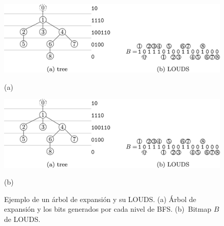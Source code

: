 \begin{figure}%
    	\centering
    	\begin{minipage}{0.45\textwidth}
    		\centering
    		\includegraphics[scale=1.6, clip,  trim=10 16 140 0]{img/arte/LOUDS.jpg}
    		
    		(a)
    	\end{minipage}
    	\begin{minipage}{0.45\textwidth}
    		\centering
    		\includegraphics[scale=1.6, clip, trim=150 16 0 50]{img/arte/LOUDS.jpg}
    		
    		(b)
    	\end{minipage}

    \caption{Ejemplo de un árbol de expansión y su LOUDS. (a) Árbol de expansión y los bits generados por cada nivel de BFS. (b)~Bitmap $B$ de LOUDS.}
    \label{fig:LOUDS}
\end{figure}

